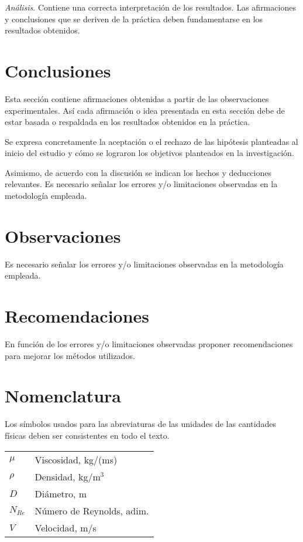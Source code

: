 \documentclass{replab}
\begin{document}
\textit{Análisis}. Contiene una correcta interpretación de los resultados. Las afirmaciones y conclusiones que se deriven de la práctica deben fundamentarse en los resultados obtenidos.

\section{Conclusiones}

Esta sección contiene afirmaciones obtenidas a partir de las observaciones experimentales. Así cada afirmación o idea presentada en esta sección debe de estar basada o respaldada en los resultados obtenidos en la práctica.

Se expresa concretamente la aceptación o el rechazo de las hipótesis planteadas al inicio del estudio y cómo se lograron los objetivos planteados en la investigación.

Asimismo, de acuerdo con la discusión se indican los hechos y deducciones relevantes. Es necesario señalar los errores y/o limitaciones observadas en la metodología empleada.

\section{Observaciones}

Es necesario señalar los errores y/o limitaciones observadas en la metodología empleada.

\section{Recomendaciones}

En función de los errores y/o limitaciones observadas proponer recomendaciones para mejorar los métodos utilizados.

\section*{Nomenclatura}

Los símbolos usados para las abreviaturas de las unidades de las cantidades físicas deben ser consistentes en todo el texto.

\vspace{1em}

\begin{tabular}{ll}
  $\mu$      & Viscosidad, kg/(ms) \\
  $\rho$     & Densidad, kg/m$^3$ \\
  $D$        & Diámetro, m \\
  $N_{Re}$   & Número de Reynolds, adim. \\
  $V$        & Velocidad, m/s \\
\end{tabular}
\end{document}
